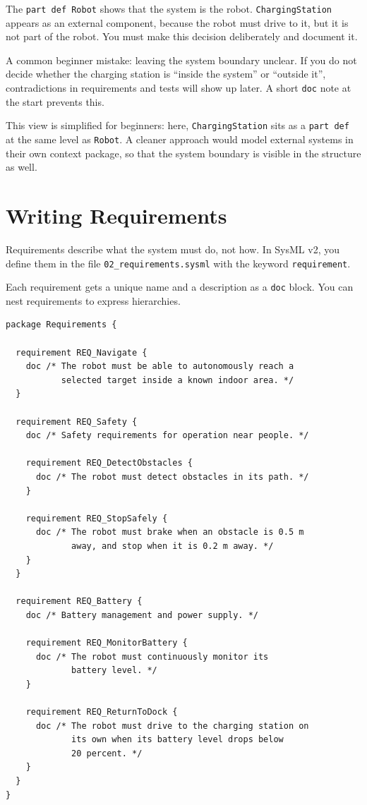 The \texttt{part def Robot} shows that the system is the robot. \texttt{ChargingStation} appears as an external component, because the robot must drive to it, but it is not part of the robot. You must make this decision deliberately and document it.

\begin{praxisbox}
A common beginner mistake: leaving the system boundary unclear. If you do not decide whether the charging station is \enquote{inside the system} or \enquote{outside it}, contradictions in requirements and tests will show up later. A short \texttt{doc} note at the start prevents this.
\end{praxisbox}

This view is simplified for beginners: here, \texttt{ChargingStation} sits as a \texttt{part def} at the same level as \texttt{Robot}. A cleaner approach would model external systems in their own context package, so that the system boundary is visible in the structure as well.

\section{Writing Requirements}

Requirements describe what the system must do, not how. In SysML v2, you define them in the file \texttt{02\_requirements.sysml} with the keyword \texttt{requirement}.

Each requirement gets a unique name and a description as a \texttt{doc} block. You can nest requirements to express hierarchies.

\begin{lstlisting}
package Requirements {

  requirement REQ_Navigate {
    doc /* The robot must be able to autonomously reach a
           selected target inside a known indoor area. */
  }

  requirement REQ_Safety {
    doc /* Safety requirements for operation near people. */

    requirement REQ_DetectObstacles {
      doc /* The robot must detect obstacles in its path. */
    }

    requirement REQ_StopSafely {
      doc /* The robot must brake when an obstacle is 0.5 m
             away, and stop when it is 0.2 m away. */
    }
  }

  requirement REQ_Battery {
    doc /* Battery management and power supply. */

    requirement REQ_MonitorBattery {
      doc /* The robot must continuously monitor its
             battery level. */
    }

    requirement REQ_ReturnToDock {
      doc /* The robot must drive to the charging station on
             its own when its battery level drops below
             20 percent. */
    }
  }
}
\end{lstlisting}

